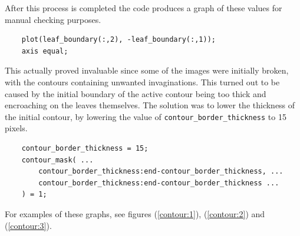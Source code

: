\documentclass[12pt,english]{article}
\begin{document}
After this process is completed the code produces a graph of these
values for manual checking purposes.
\begin{verbatim}
    plot(leaf_boundary(:,2), -leaf_boundary(:,1));
    axis equal;
\end{verbatim}
This actually proved invaluable since some of the images were initially broken,
with the contours containing unwanted invaginations. This turned out to be caused
by the initial boundary of the active contour being too thick and
encroaching on the leaves themselves. The solution was to lower the
thickness of the initial contour, by lowering the value of
\verb|contour_border_thickness| to 15 pixels.
\begin{verbatim}
    contour_border_thickness = 15;
    contour_mask( ...
        contour_border_thickness:end-contour_border_thickness, ...
        contour_border_thickness:end-contour_border_thickness ...
    ) = 1;
\end{verbatim}
For examples of these graphs, see figures (\ref{contour:1}), (\ref{contour:2}) and (\ref{contour:3}).
\end{document}
